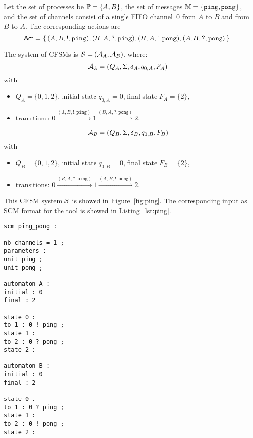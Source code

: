 \begin{example}\label{exm:ping}

Let the set of processes be $\mathbb{P} = \{A,B\}$,
the set of messages $\mathbb{M} = \{\texttt{ping},\texttt{pong}\}$,
and the set of channels consist of a single FIFO channel~0 from 
$A$ to $B$ and from $B$ to $A$. The corresponding actions are
$$
\mathsf{Act} = \{\, (A,B,!,\texttt{ping}), (B,A,?,\texttt{ping}), 
(B,A,!,\texttt{pong}), (A,B,?,\texttt{pong}) \,\}.
$$

The system of CFSMs is $\mathcal{S} = (\mathcal{A}_A, \mathcal{A}_B)$, where:
$$
\mathcal{A}_A = (Q_A, \Sigma, \delta_A, q_{0,A}, F_A)
$$
with
\begin{itemize}
\item $Q_A = \{0,1,2\}$, initial state $q_{0,A} = 0$, final state $F_A = \{2\}$,
\item transitions: $0 \xrightarrow{(A,B,!,\texttt{ping})} 1 \xrightarrow{(B,A,?,\texttt{pong})} 2$.
\end{itemize}
$$
\mathcal{A}_B = (Q_B, \Sigma, \delta_B, q_{0,B}, F_B)
$$
with
\begin{itemize}
\item $Q_B = \{0,1,2\}$, initial state $q_{0,B} = 0$, final state $F_B = \{2\}$,
\item transitions: $0 \xrightarrow{(B,A,?,\texttt{ping})} 1 \xrightarrow{(A,B,!,\texttt{pong})} 2$.
\end{itemize}

This CFSM system $\mathcal{S}$ is showed in Figure~\ref{fig:ping}. The corresponding
input as SCM format for the tool is showed in Listing~\ref{lst:ping}.

\bigskip

\begin{lstlisting}[language={},caption={Tool's input for Example~\ref{exm:ping}},label={lst:ping}]
scm ping_pong :

nb_channels = 1 ;
parameters :
unit ping ;
unit pong ;

automaton A :
initial : 0
final : 2

state 0 :
to 1 : 0 ! ping ;
state 1 :
to 2 : 0 ? pong ;
state 2 :

automaton B :
initial : 0
final : 2

state 0 :
to 1 : 0 ? ping ;
state 1 :
to 2 : 0 ! pong ;
state 2 :
\end{lstlisting}
  

\end{example}
